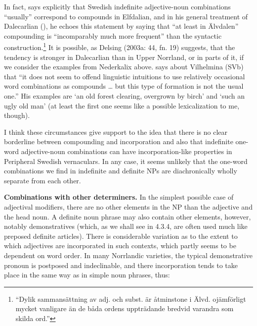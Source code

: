 
In fact, \citet[51]{Levander1909} says explicitly that Swedish indefinite adjective-noun combinations “usually” correspond to compounds in Elfdalian, and in his general treatment of Dalecarlian (\citet[142]{Levander1928}), he echoes this statement by saying that “at least in Älvdalen” compounding is “incomparably much more frequent” than the syntactic construction.\footnote{ “Dylik sammansättning av adj. och subst. är åtminstone i Älvd. ojämförligt mycket vanligare än de båda ordens uppträdande bredvid varandra som skilda ord.”} It is possible, as Delsing (2003a: 44, fn. 19) suggests, that the tendency is stronger in Dalecarlian than in Upper Norrland, or in parts of it, if we consider the examples from Nederkalix above. \citet[98]{Dahlstedt1962} says about Vilhelmina (SVb) that “it does not seem to offend linguistic intuitions to use relatively occasional word combinations as compounds … but this type of formation is not the usual one.” His examples are  ‘an old forest clearing, overgrown by birch’ and ‘such an ugly old man’ (at least the first one seems like a possible lexicalization to me, though). 


I think these circumstances give support to the idea that there is no clear borderline between compounding and incorporation and also that indefinite one-word adjective-noun combinations can have incorporation-like properties in Peripheral Swedish vernaculars. In any case, it seems unlikely that the one-word combinations we find in indefinite and definite NPs are diachronically wholly separate from each other.


\textbf{Combinations with other determiners. }In the simplest possible case of adjectival modifiers, there are no other elements in the NP than the adjective and the head noun. A definite noun phrase may also contain other elements, however, notably demonstratives (which, as we shall see in 4.3.4, are often used much like preposed definite articles). There is considerable variation as to the extent to which adjectives are incorporated in such contexts, which partly seems to be dependent on word order. In many Norrlandic varieties, the typical demonstrative pronoun is postposed and indeclinable, and there incorporation tends to take place in the same way as in simple noun phrases, thus:

